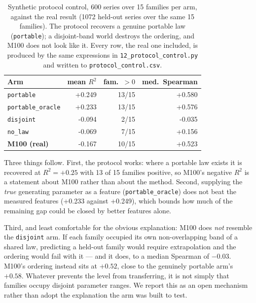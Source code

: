 \documentclass[11pt,a4paper]{article}
\newcommand{\num}[1]{#1}
\begin{document}
\begin{table}[t]
\centering
\caption{Synthetic protocol control, \num{600} series over \num{15} families
per arm, against the real result (\num{1072} held-out series over the same
\num{15} families). The protocol recovers a genuine portable law
(\texttt{portable}); a disjoint-band world destroys the ordering, and M100 does
not look like it. Every row, the real one included, is produced by the same
expressions in \texttt{12\_protocol\_control.py} and written to
\texttt{protocol\_control.csv}.}
\label{tab:protocol}
\small
\begin{tabular}{lrrr}
\toprule
Arm & mean \(R^2\) & fam.\ \(>0\) & med.\ Spearman \\
\midrule
\texttt{portable}     & \num{+0.249} & 13/15 & \num{+0.580} \\
\texttt{portable\_oracle} & \num{+0.233} & 13/15 & \num{+0.576} \\
\texttt{disjoint}     & \num{-0.094} & 2/15  & \num{-0.035} \\
\texttt{no\_law}       & \num{-0.069} & 7/15  & \num{+0.156} \\
\midrule
\textbf{M100 (real)}  & \num{-0.167} & 10/15 & \num{+0.523} \\
\bottomrule
\end{tabular}
\end{table}

Three things follow. First, the protocol works: where a portable law exists it
is recovered at \(R^2 = +0.25\) with \num{13} of \num{15} families positive,
so M100's negative \(R^2\) is a statement about M100 rather than about the
method. Second, supplying the \emph{true} generating parameter as a feature
(\texttt{portable\_oracle}) does not beat the measured features
(\num{+0.233} against \num{+0.249}), which bounds how much of the remaining gap
could be closed by better features alone.

Third, and least comfortable for the obvious explanation: M100 does \emph{not}
resemble the \texttt{disjoint} arm. If each family occupied its own
non-overlapping band of a shared law, predicting a held-out family would require
extrapolation and the ordering would fail with it --- and it does, to a median
Spearman of \(-0.03\). M100's ordering instead sits at \(+0.52\), close to the
genuinely portable arm's \(+0.58\). Whatever prevents the level from
transferring, it is not simply that families occupy disjoint parameter ranges.
We report this as an open mechanism rather than adopt the explanation the arm
was built to test.
\end{document}
